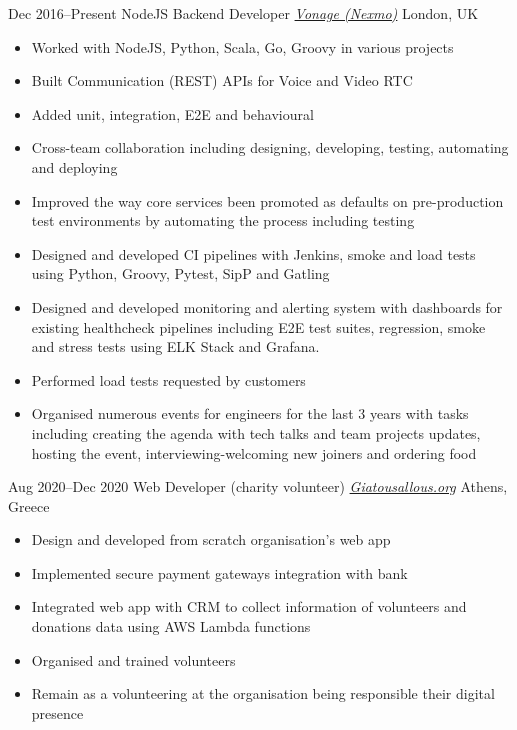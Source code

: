 \begin{entrylist}
\entry
{Dec 2016--Present}
{NodeJS Backend Developer {\normalfont \emph{\href{https://www.vonage.co.uk/}{Vonage (Nexmo)}}}}
{London, UK}
\vspace{-0.6cm}
\begin{itemize}[leftmargin=.6cm]
	\item Worked with NodeJS, Python, Scala, Go, Groovy in various projects
	\item Built Communication (REST) APIs for Voice and Video RTC
	\item Added unit, integration, E2E and behavioural
	\item Cross-team collaboration including designing, developing, testing, automating and deploying
	\item Improved the way core services been promoted as defaults on pre-production test environments by automating the process including testing
	\item Designed and developed CI pipelines with Jenkins, smoke and load tests using Python, Groovy,  Pytest, SipP and Gatling
	\item Designed and developed monitoring and alerting system with dashboards for existing healthcheck pipelines including E2E test suites, regression, smoke and stress tests using ELK Stack and Grafana.
	\item Performed load tests requested by customers
	\item Organised numerous events for engineers for the last 3 years with tasks including creating the agenda with tech talks and team projects updates, hosting the event, interviewing-welcoming new joiners and ordering food
\end{itemize}

\entry
{Aug 2020--Dec 2020}
{Web Developer (charity volunteer) {\normalfont \emph{\href{https://www.giatousallous.org/}{Giatousallous.org}}}}
{Athens, Greece}
\vspace{-0.6cm}
\begin{itemize}[leftmargin=.6cm]
	\item Design and developed from scratch organisation's web app
	\item Implemented secure payment gateways integration with bank
	\item Integrated web app with CRM to collect information of volunteers and donations data using AWS Lambda functions
	\item Organised and trained volunteers
	\item Remain as a volunteering at the organisation being responsible their digital presence
\end{itemize}


\end{entrylist}
